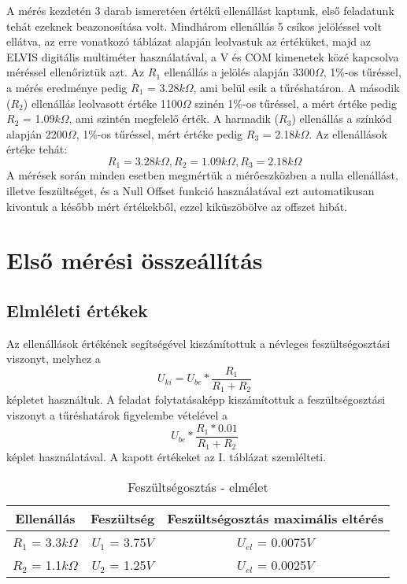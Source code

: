 \documentclass[10pt, conference,a4paper]{ITKproc}
\begin{document}
A mérés kezdetén 3 darab ismeretéen értékű ellenállást kaptunk, első feladatunk tehát ezeknek beazonosítása volt. Mindhárom ellenállás 5 csíkos jelöléssel volt ellátva, az erre vonatkozó táblázat alapján leolvastuk az értéküket, majd az ELVIS digitális multiméter használatával, a V és COM kimenetek közé kapcsolva méréssel ellenőriztük azt. Az $R_1$ ellenállás a jelölés alapján 3300$\Omega$, 1\%-os tűréssel, a mérés eredménye pedig $R_1$ = 3.28$k\Omega$, ami belül esik a tűréshatáron. A második ($R_2$) ellenállás leolvasott értéke 1100$\Omega$ szinén 1\%-os tűréssel, a mért értéke pedig $R_2$ = 1.09$k\Omega$, ami szintén megfelelő érték. A harmadik ($R_3$) ellenállás a színkód alapján 2200$\Omega$, 1\%-os tűréssel, mért értéke pedig $R_3$ = 2.18$k\Omega$. Az ellenállások értéke tehát: \[ R_1 = 3.28k\Omega, R_2 = 1.09k\Omega,   R_3 = 2.18k\Omega\] 
A mérések során minden esetben megmértük a mérőeszközben a nulla ellenállást, illetve feszültséget, és a Null Offset funkció használatával ezt automatikusan kivontuk a később mért értékekből, ezzel kiküszöbölve az offszet hibát. 
\section{Első mérési összeállítás}
\subsection{Elmléleti értékek}
Az ellenállások értékének segítségével kiszámítottuk a névleges feszültségosztási viszonyt, melyhez a \[U_{ki} = U_{be} * \frac{R_1}{R_1+R_2}\] képletet használtuk. A feladat folytatásaképp kiszámítottuk a feszültségosztási viszonyt a tűréshatárok figyelembe vételével a \[U_{be} * \frac{R_1*0.01}{R_1+R_2}\] képlet használatával. A kapott értékeket az I. táblázat szemlélteti. 

\begin{table}[ht!]
\renewcommand{\arraystretch}{1.3}
\caption{Feszültségosztás - elmélet}
\centering
\begin{tabular}{c||c||c}
\hline
\bfseries Ellenállás & \bfseries Feszültség & \bfseries Feszültségosztás maximális eltérés\\
\hline\hline
 $R_1$ = 3.3$k\Omega$ & $U_1$ = 3.75$V$  & $U_{el}$ = 0.0075$V$\\
\hline
 $R_2$ = 1.1$k\Omega$ & $U_2$ = 1.25$V$  & $U_{el}$ = 0.0025$V$\\
\hline
\end{tabular}
\end{table}
\end{document}
